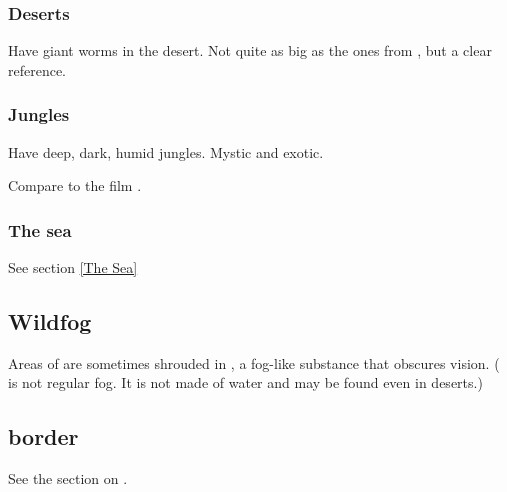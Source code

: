 \subsubsection{Deserts}
Have giant worms in the desert. Not quite as big as the ones from , but a clear reference. 





\subsubsection{Jungles}
Have deep, dark, humid jungles. 
Mystic and exotic. 

Compare to the film \cite{Movie:IceAge:III}. 





\subsubsection{The sea}
See section \ref{The Sea}









\subsection{Wildfog}
\index{\wildfog}
Areas of \Wylde{} are sometimes shrouded in \wildfog, a fog-like substance that obscures vision. 
(\Wildfog{} is not regular fog. It is not made of water and may be found even in deserts.) 










\subsection{\Wylde border}
See the section on . 







































